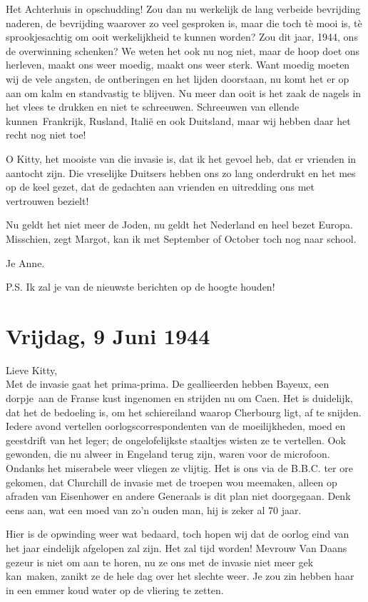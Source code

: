 \documentclass{book}
\begin{document}
Het Achterhuis in opschudding! Zou dan nu werkelijk de lang verbeide bevrijding
naderen, de bevrijding waarover zo veel gesproken is, maar die toch tè mooi is,
tè sprookjesachtig om ooit werkelijkheid te kunnen worden? Zou dit jaar, 1944,
ons de overwinning schenken? We weten het ook nu nog niet, maar de hoop doet ons
herleven, maakt ons weer moedig, maakt ons weer sterk. Want moedig moeten wij de
vele angsten, de ontberingen en het lijden doorstaan, nu komt het er op aan om
kalm en standvastig te blijven. Nu meer dan ooit is het zaak de nagels in het
vlees te drukken en niet te schreeuwen. Schreeuwen van ellende kunnen~Frankrijk,
Rusland, Italië en ook Duitsland, maar wij hebben daar het recht nog niet toe!

O Kitty, het mooiste van die invasie is, dat ik het gevoel heb, dat er vrienden
in aantocht zijn. Die vreselijke Duitsers hebben ons zo lang onderdrukt en het
mes op de keel gezet, dat de gedachten aan vrienden en uitredding ons met
vertrouwen bezielt!

Nu geldt het niet meer de Joden, nu geldt het Nederland en heel bezet Europa.
Misschien, zegt Margot, kan ik met September of October toch nog naar school.

Je Anne.

P.S. Ik zal je van de nieuwste berichten op de hoogte houden!

\section*{Vrijdag, 9 Juni 1944}

Lieve Kitty,\\
Met de invasie gaat het prima-prima. De geallieerden hebben
Bayeux, een dorpje~aan de Franse kust ingenomen en strijden nu om Caen. Het is
duidelijk, dat het de bedoeling is, om het schiereiland waarop Cherbourg ligt,
af te snijden. Iedere avond vertellen oorlogscorrespondenten van de
moeilijkheden, moed en geestdrift van het leger; de ongelofelijkste staaltjes
wisten ze te vertellen. Ook gewonden, die nu alweer in Engeland terug zijn,
waren voor de microfoon.  Ondanks het miserabele weer vliegen ze vlijtig. Het is
ons via de B.B.C.  ter ore gekomen, dat Churchill de invasie met de troepen wou
meemaken, alleen op afraden van Eisenhower en andere Generaals is dit plan niet
doorgegaan. Denk eens aan, wat een moed van zo'n ouden man, hij is zeker al 70
jaar.

Hier is de opwinding weer wat bedaard, toch hopen wij dat de oorlog eind van het
jaar eindelijk afgelopen zal zijn. Het zal tijd worden! Mevrouw Van Daans gezeur
is niet om aan te horen, nu ze ons met de invasie niet meer gek kan~maken,
zanikt ze de hele dag over het slechte weer. Je zou zin hebben haar in een emmer
koud water op de vliering te zetten.
\end{document}
